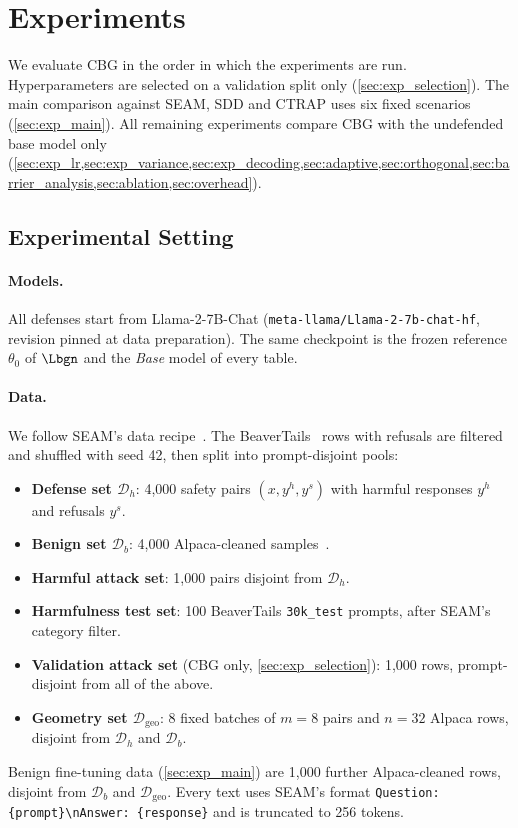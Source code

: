 
\providecommand{\tbd}{--}

\section{Experiments}
\label{sec:experiments}

We evaluate CBG in the order in which the experiments are run. Hyperparameters are selected on a validation split only (\cref{sec:exp_selection}). The main comparison against SEAM, SDD and CTRAP uses six fixed scenarios (\cref{sec:exp_main}). All remaining experiments compare CBG with the undefended base model only (\cref{sec:exp_lr,sec:exp_variance,sec:exp_decoding,sec:adaptive,sec:orthogonal,sec:barrier_analysis,sec:ablation,sec:overhead}).

\subsection{Experimental Setting}
\label{sec:setting}

\paragraph{Models.}
All defenses start from Llama-2-7B-Chat (\texttt{meta-llama/Llama-2-7b-chat-hf}, revision pinned at data preparation). The same checkpoint is the frozen reference $\theta_0$ of $\Lbgn$ and the \emph{Base} model of every table.

\paragraph{Data.}
We follow SEAM's data recipe~\citep{wang2026seam}. The BeaverTails~\citep{ji2023beavertails} rows with refusals are filtered and shuffled with seed 42, then split into prompt-disjoint pools:
\begin{itemize}
  \item \textbf{Defense set $\mathcal D_h$}: 4{,}000 safety pairs $(x, y^h, y^s)$ with harmful responses $y^h$ and refusals $y^s$.
  \item \textbf{Benign set $\mathcal D_b$}: 4{,}000 Alpaca-cleaned samples~\citep{taori2023alpaca}.
  \item \textbf{Harmful attack set}: 1{,}000 pairs disjoint from $\mathcal D_h$.
  \item \textbf{Harmfulness test set}: 100 BeaverTails \texttt{30k\_test} prompts, after SEAM's category filter.
  \item \textbf{Validation attack set} (CBG only, \cref{sec:exp_selection}): 1{,}000 rows, prompt-disjoint from all of the above.
  \item \textbf{Geometry set $\mathcal D_{\mathrm{geo}}$}: 8 fixed batches of $m=8$ pairs and $n=32$ Alpaca rows, disjoint from $\mathcal D_h$ and $\mathcal D_b$.
\end{itemize}
Benign fine-tuning data (\cref{sec:exp_main}) are 1{,}000 further Alpaca-cleaned rows, disjoint from $\mathcal D_b$ and $\mathcal D_{\mathrm{geo}}$. Every text uses SEAM's format \texttt{Question: \{prompt\}\textbackslash nAnswer: \{response\}} and is truncated to 256 tokens.

